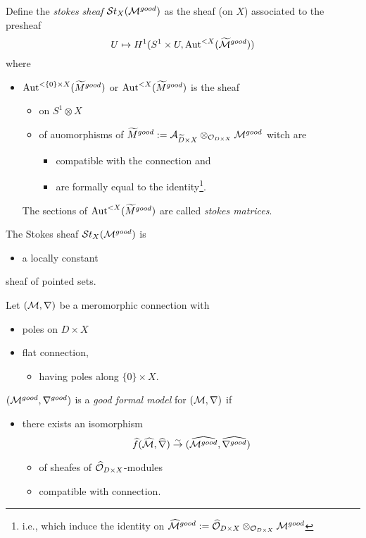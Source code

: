 \begin{defn}
  Define the \emph{stokes sheaf} $\mathcal{S}{}t_X(\mathcal{M}^{good})$ as the sheaf (on $X$)
  associated to the presheaf
  \[
    U\mapsto H^1(S^1\times U,\operatorname{Aut}^{<X}(\widetilde {\mathcal{M}}^{good}) )
  \]
  where
  \begin{itemize}
    \item $\operatorname{Aut}^{<\{0\}\times X}(\widetilde M^{good})$ or
      $\operatorname{Aut}^{<X}(\widetilde M^{good})$ is the sheaf
      \begin{itemize}
        \item on $S^1\otimes X$
        \item of auomorphisms of $\widetilde M^{good}:=\mathcal{A}_{\widetilde D\times
          X}\otimes_{\mathcal{O}_{D\times X}}\mathcal{M}^{good}$
          witch are
          \begin{itemize}
            \item compatible with the connection and
            \item are formally equal to the identity\footnote{i.e., which
              induce the identity on $\widehat {\mathcal{M}}^{good}:=\widehat {\mathcal{O}}_{D\times
              X}\otimes_{\mathcal{O}_{D\times X}}\mathcal{M}^{good}$}.
          \end{itemize}
      \end{itemize}
      The sections of $\operatorname{Aut}^{<X}(\widetilde M^{good})$ are called \emph{stokes
      matrices}.
  \end{itemize}
\end{defn}
\begin{thm}
  The Stokes sheaf $\mathcal{S}{}t_X(\mathcal{M}^{good})$ is
  \begin{itemize}
    \item a locally constant
  \end{itemize}
  sheaf of pointed sets.
\end{thm}
Let $(\mathcal{M},\nabla)$ be a meromorphic connection with
\begin{itemize}
  \item poles on $D\times X$ 
  \item flat connection, 
    \begin{itemize}
      \item having poles along $\{0\}\times X$.
    \end{itemize}
\end{itemize}
\begin{defn}
  $(\mathcal{M}^{good},\nabla^{good})$ is a \emph{good formal model} for
  $(\mathcal{M},\nabla)$ if
  \begin{itemize}
    \item there exists an isomorphism 
      \[
        \widehat f(\widehat{\mathcal{M}},\widehat\nabla)\overset{\sim}{\to}
        (\widehat{\mathcal{M}^{good}},\widehat{\nabla^{good}})
      \]
      \begin{itemize}
        \item of sheafes of $\widehat{\mathcal{O}}_{D\times X}$-modules
        \item compatible with connection.
      \end{itemize}
  \end{itemize}
\end{defn}
